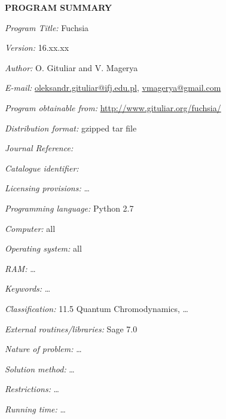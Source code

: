 {\bf PROGRAM SUMMARY}

\begin{small}
\noindent

{\em Program Title:} Fuchsia

{\em Version:} 16.xx.xx

{\em Author:} O. Gituliar and V. Magerya

{\em E-mail:} \href{mailto:oleksandr.gituliar@ifj.edu.pl}{oleksandr.gituliar@ifj.edu.pl},
              \href{mailto:vmagerya@gmail.com}{vmagerya@gmail.com}

{\em Program obtainable from:} \url{http://www.gituliar.org/fuchsia/}

{\em Distribution format:} gzipped tar file

{\em Journal Reference:}

{\em Catalogue identifier:}

{\em Licensing provisions:} \ldots

{\em Programming language:} Python 2.7

{\em Computer:} all

{\em Operating system:} all

{\em RAM:} \ldots

{\em Keywords:} \ldots

{\em Classification:} 
     11.5 Quantum Chromodynamics, \ldots

{\em External routines/libraries:} Sage 7.0

{\em Nature of problem:} \ldots
     
{\em Solution method:} \ldots
     
{\em Restrictions:} \ldots
     
{\em Running time:} \ldots
     
\end{small}
